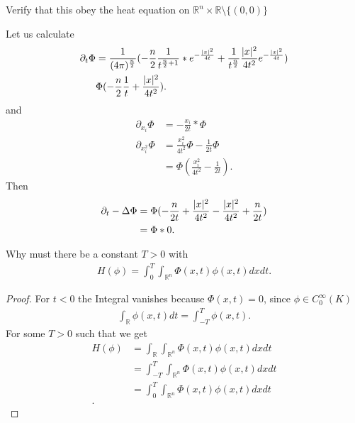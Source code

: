 \newpage
\begin{exercise}[b]
 Verify that this obey the heat equation on $\mathbb{R}^{n}  \times  \mathbb{R} \setminus \{(0,0)\}  $  
\end{exercise}
\begin{solution}
  Let us calculate 
  \begin{align*}
    \partial_t \Phi  &= \frac{1}{(4\pi)^{\frac{n}{2}}  }(-\frac{n}{2} \frac{1}{t^{\frac{n}{2}+1}}*e^{-\frac{\lvert x\rvert^2}{4t}} + \frac{1}{t^{\frac{n}{2}}} \frac{\lvert x\rvert^2}{4t^2}e^{-\frac{\lvert x\rvert^2}{4t}} )\\
                     & \Phi (-\frac{n}{2}\frac{1}{t} + \frac{\lvert x\rvert^2}{4t^2})
  .\end{align*}
  and 
  \begin{align*}
    \partial_{x_i} \Phi  &= - \frac{x_i}{2t}*\Phi \\
    \partial_{x_i^2} \Phi  &=  \frac{x_i^2}{4t^2}\Phi  -  \frac{1}{2t}\Phi \\
                           &= \Phi ( \frac{x_i^2}{4t^2} -  \frac{1}{2t})
  .\end{align*}
  Then 
  \begin{align*}
    \partial_t - \Delta  \Phi  &= \Phi (-\frac{n}{2t}+\frac{\lvert x\rvert^2}{4t^2} -\frac{\lvert x\rvert^2}{4t^2} + \frac{n}{2t} )\\
                               &= \Phi *0
  .\end{align*}
\end{solution}
\begin{exercise}[c]
 Why must there be a constant $T>0$  with 
 \begin{align*}
   H(\phi ) = \int_0^{T}  \int_{\mathbb{R}^{n} } \Phi(x,t)\phi(x,t)dx dt
 .\end{align*}
\end{exercise}
\begin{proof}
 For $t<0$  the Integral vanishes because $\Phi(x,t) = 0$, since $\phi  \in  C_0^{\infty}(K) $ 
 \begin{align*}
   \int_{\mathbb{R}} \phi(x,t) dt = \int_{-T}^{T}  \phi(x,t)
 .\end{align*}
 For some $T>0$ such that we get 
 \begin{align*}
   H(\phi ) &= \int_{\mathbb{R}}  \int_{\mathbb{R}^{n} } \Phi(x,t)\phi(x,t)dx dt\\
            &= \int_{-T}^{T}   \int_{\mathbb{R}^{n} } \Phi(x,t)\phi(x,t)dx dt\\
            &= \int_{0}^{T}   \int_{\mathbb{R}^{n} } \Phi(x,t)\phi(x,t)dx dt\\
 .\end{align*}
\end{proof}
